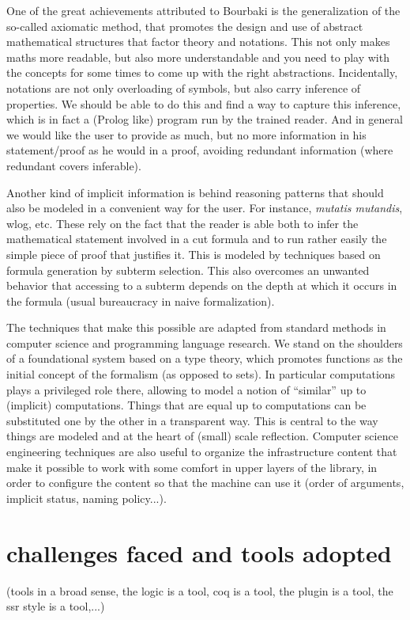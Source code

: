 One of the great achievements attributed to Bourbaki is the
generalization of the so-called axiomatic method, that promotes the
design and use of abstract mathematical structures that factor theory
and notations. This not only makes maths more readable, but also more
understandable and you need to play with the concepts for some times
to come up with the right abstractions. Incidentally, notations are
not only overloading of symbols, but also carry inference of
properties. We should be able to do this and find a way to capture this
inference, which is in fact a (Prolog like) program run by the trained
reader. And in general we would like the user to provide as much, but
no more information in his statement/proof as he would in a proof,
avoiding redundant information (where redundant covers inferable).

Another kind of implicit information is behind reasoning patterns that
should also be modeled in a convenient way for the user. For instance,
\emph{mutatis mutandis}, wlog, etc. These rely on the fact that the
reader is able both to infer the mathematical statement involved in a
cut formula 
 and to run rather easily the simple piece of proof that
justifies it. This is modeled by techniques based on formula generation
by subterm selection. This also overcomes an unwanted behavior that
accessing to a subterm depends on the depth at which it occurs in the
formula (usual bureaucracy in naive formalization).

The techniques that make this possible are adapted from standard
methods in computer science and programming language research. We stand on the
shoulders of a foundational system based on a type theory, which
promotes functions as the initial concept of the formalism (as opposed
to sets). In particular computations plays a privileged role there,
allowing to model a notion of ``similar'' up to (implicit)
computations. Things that are equal up to computations can be
substituted one by the other in a transparent way. This is central to
the way things are modeled and at the heart of (small) scale
reflection. Computer science engineering techniques are also useful
to organize the infrastructure content that make it possible to work with
some comfort in upper layers of the library, in order to configure
the content so that the machine can use it (order of arguments,
implicit status, naming policy...).


\section{challenges faced and tools adopted}
(tools in a broad sense, the logic is a tool, coq is a tool, the plugin
is a tool, the ssr style is a tool,...)

